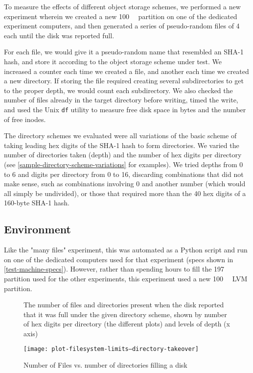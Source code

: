 To measure the effects of different object storage schemes, we performed a new
experiment wherein we created a new \SI{100}{\mebi\byte} partition on one of the
dedicated experiment computers, and then generated a series of pseudo-random
files of \SI{4}{\kibi\byte} each until the disk was reported full.

For each file, we would give it a pseudo-random name that resembled an SHA-1
hash, and store it according to the object storage scheme under test. We
increased a counter each time we created a file, and another each time we
created a new directory. If storing the file required creating several
subdirectories to get to the proper depth, we would count each subdirectory. We
also checked the number of files already in the target directory before writing,
timed the write, and used the Unix \lstinline{df} utility to measure free disk
space in bytes and the number of free \glspl{inode}.

The directory schemes we evaluated were all variations of the basic scheme of
taking leading hex digits of the SHA-1 hash to form directories. We varied the
number of directories taken (depth) and the number of hex digits per directory
(see \autoref{sample-directory-scheme-variations} for examples). We tried depths
from \num{0} to \num{6} and digits per directory from \num{0} to \num{16},
discarding combinations that did not make sense, such as combinations involving
\num{0} and another number (which would all simply be undivided), or those that
required more than the \num{40} hex digits of a \num{160}-byte SHA-1 hash.

\subsection{Environment}

Like the "many files" experiment, this was automated as a Python script and run
on one of the dedicated computers used for that experiment (specs shown in
\autoref{test-machine-specs}). However, rather than spending hours to fill the
\SI{197}{\gibi\byte} partition used for the other experiments, this experiment
used a new \SI{100}{\mebi\byte} LVM partition.


\begin{figure}[b!]
        \caption{Number of Files vs. number of directories filling a disk}
        \label{fig:plot-filesystem-limits--directory-takeover}
        \centering

        The number of files and directories present when the disk reported that it
        was full under the given directory scheme, shown by number of hex digits per
        directory (the different plots) and levels of depth (x axis)

        \texttt{[image: plot-filesystem-limits--directory-takeover]}
\end{figure}


